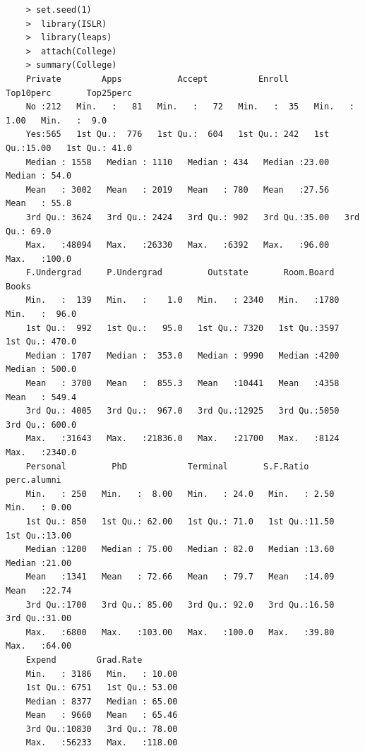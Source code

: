 \documentclass{article}
\begin{document}
\begin{program}
	\begin{verbatim}
	> set.seed(1)
	>  library(ISLR)
	>  library(leaps)
	>  attach(College)
	> summary(College)
	Private        Apps           Accept          Enroll       Top10perc       Top25perc    
	No :212   Min.   :   81   Min.   :   72   Min.   :  35   Min.   : 1.00   Min.   :  9.0  
	Yes:565   1st Qu.:  776   1st Qu.:  604   1st Qu.: 242   1st Qu.:15.00   1st Qu.: 41.0  
	Median : 1558   Median : 1110   Median : 434   Median :23.00   Median : 54.0  
	Mean   : 3002   Mean   : 2019   Mean   : 780   Mean   :27.56   Mean   : 55.8  
	3rd Qu.: 3624   3rd Qu.: 2424   3rd Qu.: 902   3rd Qu.:35.00   3rd Qu.: 69.0  
	Max.   :48094   Max.   :26330   Max.   :6392   Max.   :96.00   Max.   :100.0  
	F.Undergrad     P.Undergrad         Outstate       Room.Board       Books       
	Min.   :  139   Min.   :    1.0   Min.   : 2340   Min.   :1780   Min.   :  96.0  
	1st Qu.:  992   1st Qu.:   95.0   1st Qu.: 7320   1st Qu.:3597   1st Qu.: 470.0  
	Median : 1707   Median :  353.0   Median : 9990   Median :4200   Median : 500.0  
	Mean   : 3700   Mean   :  855.3   Mean   :10441   Mean   :4358   Mean   : 549.4  
	3rd Qu.: 4005   3rd Qu.:  967.0   3rd Qu.:12925   3rd Qu.:5050   3rd Qu.: 600.0  
	Max.   :31643   Max.   :21836.0   Max.   :21700   Max.   :8124   Max.   :2340.0  
	Personal         PhD            Terminal       S.F.Ratio      perc.alumni   
	Min.   : 250   Min.   :  8.00   Min.   : 24.0   Min.   : 2.50   Min.   : 0.00  
	1st Qu.: 850   1st Qu.: 62.00   1st Qu.: 71.0   1st Qu.:11.50   1st Qu.:13.00  
	Median :1200   Median : 75.00   Median : 82.0   Median :13.60   Median :21.00  
	Mean   :1341   Mean   : 72.66   Mean   : 79.7   Mean   :14.09   Mean   :22.74  
	3rd Qu.:1700   3rd Qu.: 85.00   3rd Qu.: 92.0   3rd Qu.:16.50   3rd Qu.:31.00  
	Max.   :6800   Max.   :103.00   Max.   :100.0   Max.   :39.80   Max.   :64.00  
	Expend        Grad.Rate     
	Min.   : 3186   Min.   : 10.00  
	1st Qu.: 6751   1st Qu.: 53.00  
	Median : 8377   Median : 65.00  
	Mean   : 9660   Mean   : 65.46  
	3rd Qu.:10830   3rd Qu.: 78.00  
	Max.   :56233   Max.   :118.00  
	\end{verbatim}
\end{program}


\newpage
\end{document}

